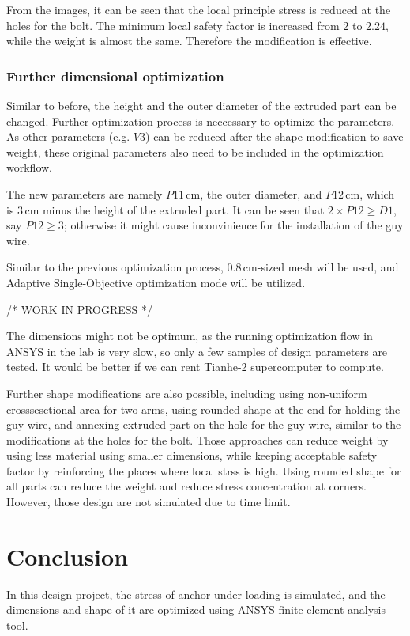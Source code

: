 \documentclass[a4paper,14pt]{extarticle}
\newcommand{\cm}{\,\si{\centi\meter}}
\begin{document}
From the images, it can be seen that the local principle stress is reduced at the holes for the bolt. The minimum local safety factor is increased from $2$ to $2.24$, while the weight is almost the same. Therefore the modification is effective.
\subsubsection{Further dimensional optimization}
Similar to before, the height and the outer diameter of the extruded part can be changed. Further optimization process is neccessary to optimize the parameters. As other parameters (e.g. $V3$) can be reduced after the shape modification to save weight, these original parameters also need to be included in the optimization workflow.

The new parameters are namely $P11\cm$, the outer diameter, and $P12 \cm$, which is $3\cm$ minus the height of the extruded part. It can be seen that $2 \times P12 \geq D1$, say $P12 \geq 3$; otherwise it might cause inconvinience for the installation of the guy wire.

Similar to the previous optimization process, $0.8\cm$-sized mesh will be used, and Adaptive Single-Objective optimization mode will be utilized.

/* WORK IN PROGRESS */

The dimensions might not be optimum, as the running optimization flow in ANSYS in the lab is very slow, so only a few samples of design parameters are tested. It would be better if we can rent Tianhe-2 supercomputer to compute.

Further shape modifications are also possible, including using non-uniform crosssesctional area for two arms, using rounded shape at the end for holding the guy wire, and annexing extruded part on the hole for the guy wire, similar to the modifications at the holes for the bolt. Those approaches can reduce weight by using less material using smaller dimensions, while keeping acceptable safety factor by reinforcing the places where local strss is high. Using rounded shape for all parts can reduce the weight and reduce stress concentration at corners. However, those design are not simulated due to time limit. 
\section{Conclusion}
In this design project, the stress of anchor under loading is simulated, and the dimensions and shape of it are optimized using ANSYS finite element analysis tool.
\end{document}

